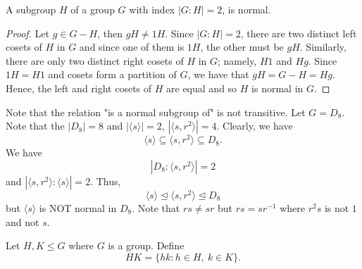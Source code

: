 \begin{eg}
   A subgroup \( H  \) of a group \( G  \) with index \( | G : H  |  =  2  \), is normal. 
\end{eg}
\begin{proof}
Let \( g \in G - H  \), then \( gH \neq 1H  \). Since \( | G : H  |  = 2  \), there are two distinct left cosets of \( H  \) in \( G  \) and since one of them is \( 1  H  \), the other must be \( g H  \). Similarly, there are only two distinct right cosets of \( H  \) in \( G  \); namely, \( H1   \) and \( Hg  \). Since \( 1 H = H 1  \) and cosets form a partition of \( G  \), we have that \( gH = G - H =  H g  \). Hence, the left and right cosets of \( H  \) are equal and so \( H  \) is normal in \( G  \).
\end{proof} 

\begin{eg}
   Note that the relation "is a normal subgroup of" is not transitive. Let \( G = {D}_{8} \). Note that the \( | {D}_{8} |  = 8  \) and \( | \langle s \rangle |  = 2 \), \( | \langle s, r^{2} \rangle  |  = 4  \). Clearly, we have 
   \[  \langle s \rangle \subseteq  \langle s, r^{2} \rangle \subseteq  {D}_{8}. \]
   We have 
   \[  | {D}_{8} : \langle s, r^{2} \rangle  |  = 2  \]
   and \( | \langle s, r^{2} \rangle : \langle s \rangle  |  = 2  \). Thus, 
   \[  \langle s \rangle \trianglelefteq \langle s , r^{2} \rangle \trianglelefteq {D}_{8} \]
   but \( \langle s \rangle  \) is NOT normal in \( {D}_{8} \). Note that \( r s \neq sr  \) but \( rs = s r^{-1} \) where \( r^{2} s  \) is not \( 1  \) and not \( s  \).
\end{eg}

\begin{definition}[ ]
    Let \( H,K \leq G  \) where \(  G  \) is a group. Define
    \[  H K = \{  h k : h \in H, \ k \in K \}. \]
\end{definition}

